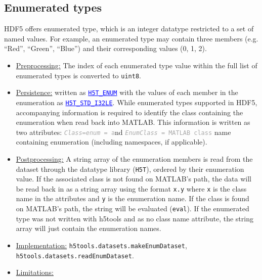 \documentclass[11pt]{exam}
\newcommand\myurl[1]{\textcolor{blue}{\underline{#1}}}
\newcommand\hdftype[1]{\texttt{\myurl{#1}}}
\newcommand\myatt[2]{\textcolor{darkgray}{\texttt{\textit{#1} = #2}}}
\begin{document}
		\subsection{Enumerated types}
		\noindent HDF5 offers enumerated type, which is an integer datatype restricted to a set of named values. For example, an enumerated type may contain three members (e.g. ``Red'', ``Green'', ``Blue'') and their corresponding values (0, 1, 2).
		\begin{itemize}
			\item \underline{Preprocessing:} The index of each enumerated type value within the full list of enumerated types is converted to \texttt{uint8}. 
			\item \underline{Persistence:} written as \myurl{\texttt{H5T\_ENUM}} with the values of each member in the enumeration as \hdftype{H5T\_STD\_I32LE}. While enumerated types supported in HDF5, accompanying information is required to identify the class containing the enumeration when read back into MATLAB. This information is written as two attributes: \myatt{Class=enum} and \myatt{EnumClass}{MATLAB class} name containing enumeration (including namespaces, if applicable).
			\item \underline{Postprocessing:} A string array of the enumeration members is read from the dataset through the datatype library (\texttt{H5T}), ordered by their enumeration value. If the associated class is not found on MATLAB's path, the data will be read back in as a string array using the format \texttt{x.y} where \texttt{x} is the class name in the attributes and \texttt{y} is the enumeration name. If the class is found on MATLAB's path, the string will be evaluated (\texttt{eval}). If the enumerated type was not written with h5tools and as no class name attribute, the string array will just contain the enumeration names. %
			\item \underline{Implementation:} \texttt{h5tools.datasets.makeEnumDataset}, \texttt{h5tools.datasets.readEnumDataset}.
			\item \underline{Limitations:} 
		\end{itemize}
		
\end{document}
